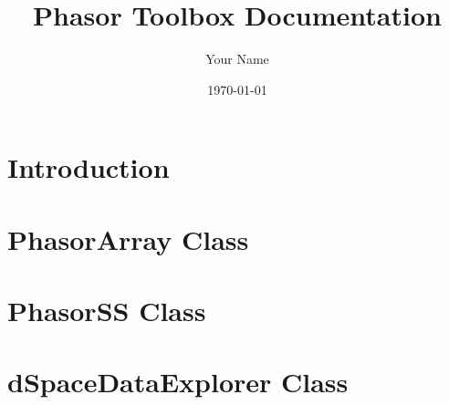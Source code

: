 \documentclass[a4paper,12pt]{report}
\title{Phasor Toolbox Documentation}
\author{Your Name}
\date{\today}
\begin{document}
\maketitle

\tableofcontents

\chapter{Introduction}


\chapter{PhasorArray Class}


\chapter{PhasorSS Class}


\chapter{dSpaceDataExplorer Class}




\end{document}
